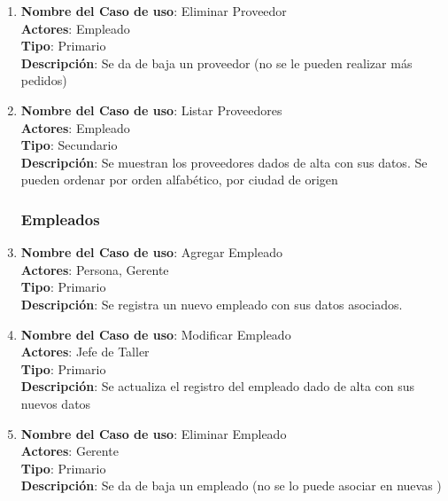 \documentclass[12pt]{extarticle}
\begin{document}
\begin{spacing}{1.2}
\begin{enumerate}
        \item 	\textbf{Nombre del Caso de uso}: Eliminar Proveedor\\
                \textbf{Actores}: Empleado\\
                \textbf{Tipo}: Primario\\
                \textbf{Descripción}: Se da de baja un proveedor (no se le pueden realizar más pedidos)
        
        \item 	\textbf{Nombre del Caso de uso}: Listar Proveedores\\
                \textbf{Actores}: Empleado\\
                \textbf{Tipo}: Secundario\\
                \textbf{Descripción}: Se muestran los proveedores dados de alta con sus datos. Se pueden ordenar por orden alfabético, por ciudad de origen



        \subsubsection{Empleados}



        \item 	\textbf{Nombre del Caso de uso}: Agregar Empleado\\
                \textbf{Actores}: Persona, Gerente\\
                \textbf{Tipo}: Primario\\
                \textbf{Descripción}: Se registra un nuevo empleado con sus datos asociados.
        
        \item 	\textbf{Nombre del Caso de uso}: Modificar Empleado\\
                \textbf{Actores}: Jefe de Taller\\
                \textbf{Tipo}: Primario\\
                \textbf{Descripción}: Se actualiza el registro del empleado dado de alta con sus nuevos datos
        
        \item 	\textbf{Nombre del Caso de uso}: Eliminar Empleado\\
                \textbf{Actores}: Gerente\\
                \textbf{Tipo}: Primario\\
                \textbf{Descripción}: Se da de baja un empleado (no se lo puede asociar en nuevas \OTs{})
        

\end{enumerate}
\end{spacing}
\end{document}
